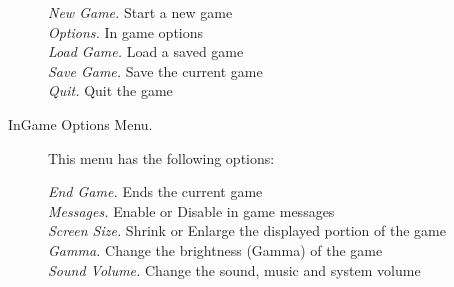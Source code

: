 \begin{description}
  \emph{New Game. } Start a new game\\
  \emph{Options. } In game options\\
  \emph{Load Game. } Load a saved game\\
  \emph{Save Game. } Save the current game\\
  \emph{Quit. } Quit the game%

  \item[InGame Options Menu. ]This menu has the following options:
  
  \emph{End Game. } Ends the current game\\
  \emph{Messages. }  Enable or Disable in game messages\\
  \emph{Screen Size. } Shrink or Enlarge the displayed portion of the game\\
  \emph{Gamma. } Change the brightness (Gamma) of the game\\
  \emph{Sound Volume. } Change the sound, music and system volume%

\end{description}

